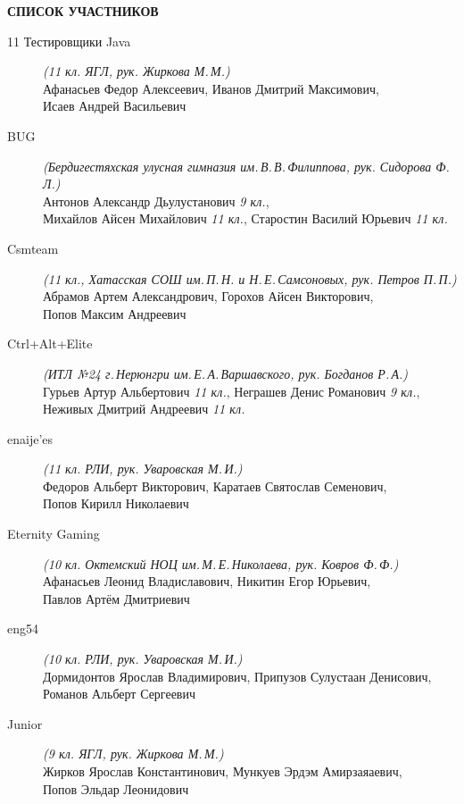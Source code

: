 \newpage
\noindent
\textbf{СПИСОК УЧАСТНИКОВ}
\begin{description}

\item[11 Тестировщики Java] \textit{(11 кл. ЯГЛ, рук. Жиркова М.\,М.)} \\
Афанасьев Федор Алексеевич, Иванов Дмитрий Максимович, \\
Исаев Андрей Васильевич

\item[BUG] \textit{(Бердигестяхская улусная гимназия им.\,В.\,В.\,Филиппова, рук. Сидорова Ф.\,Л.)} \\
Антонов Александр Дьулустанович \textit{9 кл.}, \\
Михайлов Айсен Михайлович \textit{11 кл.}, Старостин Василий Юрьевич \textit{11 кл.}

\item[Csmteam] \textit{(11 кл., Хатасская СОШ им.\,П.\,Н. и Н.\,Е.\,Самсоновых, рук. Петров П.\,П.)} \\
Абрамов Артем Александрович, Горохов Айсен Викторович, \\
Попов Максим Андреевич

\item[Ctrl+Alt+Elite] \textit{(ИТЛ №24 г.\,Нерюнгри им.\,Е.\,А.\,Варшавского, рук. Богданов Р.\,А.)} \\
Гурьев Артур Альбертович \textit{11 кл.}, Неграшев Денис Романович \textit{9 кл.}, \\
Неживых Дмитрий Андреевич \textit{11 кл.}

\item[enaije'es] \textit{(11 кл. РЛИ, рук. Уваровская М.\,И.)} \\
Федоров Альберт Викторович, Каратаев Святослав Семенович, \\
Попов Кирилл Николаевич

\item[Eternity Gaming] \textit{(10 кл. Октемский НОЦ им.\,М.\,Е.\,Николаева, рук. Ковров Ф.\,Ф.)} \\
Афанасьев Леонид Владиславович, Никитин Егор Юрьевич, \\
Павлов Артём Дмитриевич

\item[eng54] \textit{(10 кл. РЛИ, рук. Уваровская М.\,И.)} \\
Дормидонтов Ярослав Владимирович, Припузов Сулустаан Денисович, \\
Романов Альберт Сергеевич

\item[Junior] \textit{(9 кл. ЯГЛ, рук. Жиркова М.\,М.)} \\
Жирков Ярослав Константинович, Мункуев Эрдэм Амирзаяаевич, \\
Попов Эльдар Леонидович


\end{description}
